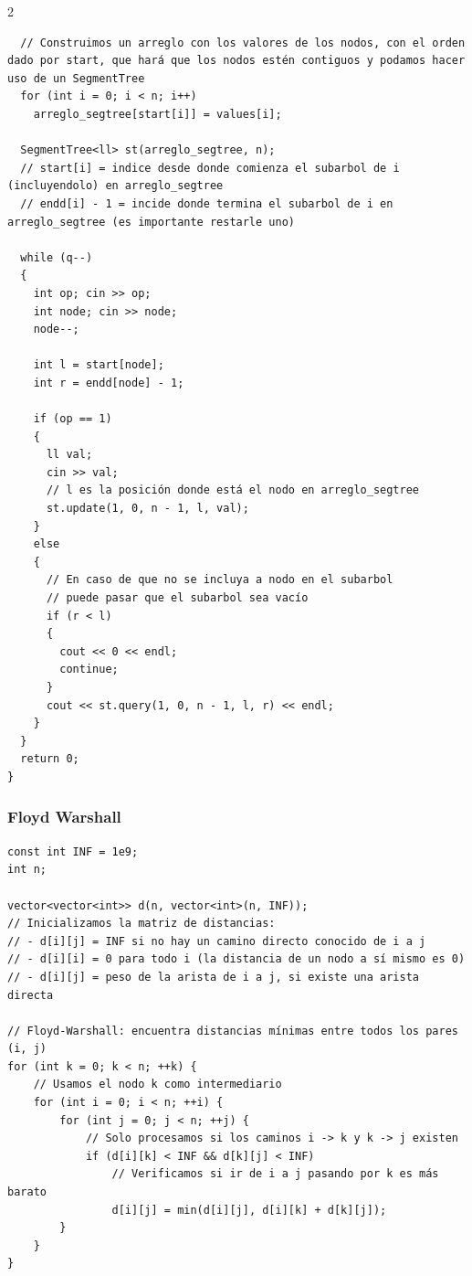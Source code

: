 \documentclass[twoside]{article}
\begin{document}
\begin{multicols*}{2}
\begin{verbatim}
  // Construimos un arreglo con los valores de los nodos, con el orden dado por start, que hará que los nodos estén contiguos y podamos hacer uso de un SegmentTree
  for (int i = 0; i < n; i++)
    arreglo_segtree[start[i]] = values[i];

  SegmentTree<ll> st(arreglo_segtree, n);
  // start[i] = indice desde donde comienza el subarbol de i (incluyendolo) en arreglo_segtree
  // endd[i] - 1 = incide donde termina el subarbol de i en arreglo_segtree (es importante restarle uno)

  while (q--)
  {
    int op; cin >> op;
    int node; cin >> node;
    node--;

    int l = start[node]; 
    int r = endd[node] - 1;

    if (op == 1)
    {
      ll val;
      cin >> val;
      // l es la posición donde está el nodo en arreglo_segtree
      st.update(1, 0, n - 1, l, val);
    }
    else
    {
      // En caso de que no se incluya a nodo en el subarbol
      // puede pasar que el subarbol sea vacío
      if (r < l)
      {
        cout << 0 << endl;
        continue;
      }
      cout << st.query(1, 0, n - 1, l, r) << endl;
    }
  }
  return 0;
}
\end{verbatim}

	{
		\subsubsection*{Floyd Warshall}
	}
	\begin{verbatim}
const int INF = 1e9;
int n; 

vector<vector<int>> d(n, vector<int>(n, INF));
// Inicializamos la matriz de distancias:
// - d[i][j] = INF si no hay un camino directo conocido de i a j
// - d[i][i] = 0 para todo i (la distancia de un nodo a sí mismo es 0)
// - d[i][j] = peso de la arista de i a j, si existe una arista directa

// Floyd-Warshall: encuentra distancias mínimas entre todos los pares (i, j)
for (int k = 0; k < n; ++k) {
    // Usamos el nodo k como intermediario
    for (int i = 0; i < n; ++i) {
        for (int j = 0; j < n; ++j) {
            // Solo procesamos si los caminos i -> k y k -> j existen
            if (d[i][k] < INF && d[k][j] < INF)
                // Verificamos si ir de i a j pasando por k es más barato
                d[i][j] = min(d[i][j], d[i][k] + d[k][j]);
        }
    }
}


\end{verbatim}
\end{multicols*}
\end{document}
